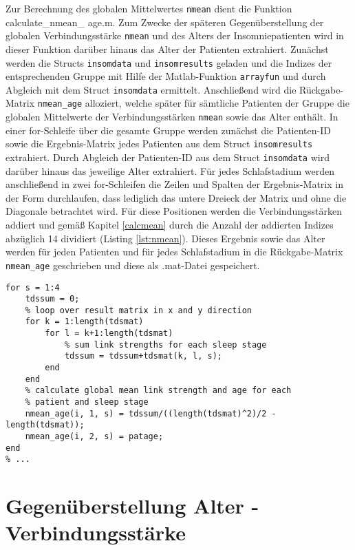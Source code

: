 Zur Berechnung des globalen Mittelwertes \texttt{nmean} dient die Funktion calculate\_nmean\_ age.m. Zum Zwecke der späteren Gegenüberstellung der globalen Verbindungsstärke \texttt{nmean} und des Alters der Insomniepatienten wird in dieser Funktion darüber hinaus das Alter der Patienten extrahiert. Zunächst werden die Structs \texttt{insomdata} und \texttt{insomresults} geladen und die Indizes der entsprechenden Gruppe mit Hilfe der Matlab-Funktion \texttt{arrayfun} und durch Abgleich mit dem Struct \texttt{insomdata} ermittelt. Anschließend wird die Rückgabe-Matrix \texttt{nmean\_age} alloziert, welche später für sämtliche Patienten der Gruppe die globalen Mittelwerte der Verbindungsstärken \texttt{nmean} sowie das Alter enthält. In einer for-Schleife über die gesamte Gruppe werden zunächst die Patienten-ID sowie die Ergebnis-Matrix jedes Patienten aus dem Struct \texttt{insomresults} extrahiert. Durch Abgleich der Patienten-ID aus dem Struct \texttt{insomdata} wird darüber hinaus das jeweilige Alter extrahiert. Für jedes Schlafstadium werden anschließend in zwei for-Schleifen die Zeilen und Spalten der Ergebnis-Matrix in der Form durchlaufen, dass lediglich das untere Dreieck der Matrix und ohne die Diagonale betrachtet wird. Für diese Positionen werden die Verbindungsstärken addiert und gemäß Kapitel \ref{calcmean} durch die Anzahl der addierten Indizes abzüglich 14 dividiert (Listing \ref{lst:nmean}). Dieses Ergebnis sowie das Alter werden für jeden Patienten und für jedes Schlafstadium in die Rückgabe-Matrix \texttt{nmean\_age} geschrieben und diese als .mat-Datei gespeichert.\\

\begin{lstlisting}[caption={Berechnung des globalen Mittelwertes in der Funktion calculate\_nmean\_age.m}, label={lst:nmean}]
% ...
for s = 1:4
    tdssum = 0;
    % loop over result matrix in x and y direction
    for k = 1:length(tdsmat)
        for l = k+1:length(tdsmat)
            % sum link strengths for each sleep stage
            tdssum = tdssum+tdsmat(k, l, s);
        end
    end
    % calculate global mean link strength and age for each
    % patient and sleep stage
    nmean_age(i, 1, s) = tdssum/((length(tdsmat)^2)/2 - length(tdsmat));
    nmean_age(i, 2, s) = patage;
end
% ...
\end{lstlisting}

\section{Gegenüberstellung Alter - Verbindungsstärke}

